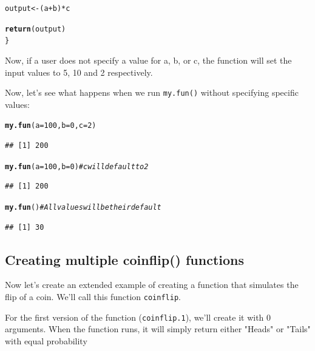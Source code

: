 \documentclass{tufte-book}\usepackage[]{graphicx}\usepackage[]{color}
\makeatletter
\newcommand{\hlnum}[1]{\textcolor[rgb]{0.686,0.059,0.569}{#1}}%
\newcommand{\hlcom}[1]{\textcolor[rgb]{0.678,0.584,0.686}{\textit{#1}}}%
\newcommand{\hlopt}[1]{\textcolor[rgb]{0,0,0}{#1}}%
\newcommand{\hlstd}[1]{\textcolor[rgb]{0.345,0.345,0.345}{#1}}%
\newcommand{\hlkwb}[1]{\textcolor[rgb]{0.69,0.353,0.396}{#1}}%
\newcommand{\hlkwc}[1]{\textcolor[rgb]{0.333,0.667,0.333}{#1}}%
\newcommand{\hlkwd}[1]{\textcolor[rgb]{0.737,0.353,0.396}{\textbf{#1}}}%
\newenvironment{kframe}{%
 \def\at@end@of@kframe{}%
 \ifinner\ifhmode%
  \def\at@end@of@kframe{\end{minipage}}%
  \begin{minipage}{\columnwidth}%
 \fi\fi%
 \def\FrameCommand##1{\hskip\@totalleftmargin \hskip-\fboxsep
 \colorbox{shadecolor}{##1}\hskip-\fboxsep
     \hskip-\linewidth \hskip-\@totalleftmargin \hskip\columnwidth}%
 \MakeFramed {\advance\hsize-\width
   \@totalleftmargin\z@ \linewidth\hsize
   \@setminipage}}%
 {\par\unskip\endMakeFramed%
 \at@end@of@kframe}
\newenvironment{knitrout}{}{} %
\makeatother
\begin{document}
\begin{footnotesize}
\begin{knitrout}
\begin{kframe}
\begin{alltt}
  \hlstd{output} \hlkwb{<-} \hlstd{(a} \hlopt{+} \hlstd{b)} \hlopt{*} \hlstd{c}

  \hlkwd{return}\hlstd{(output)}
\hlstd{\}}
\end{alltt}
\end{kframe}
\end{knitrout}

Now, if a user does not specify a value for a, b, or c, the function will set the input values to 5, 10 and 2 respectively.

Now, let's see what happens when we run \texttt{my.fun()} without specifying specific values:

\begin{knitrout}
\color{fgcolor}\begin{kframe}
\begin{alltt}
\hlkwd{my.fun}\hlstd{(}\hlkwc{a} \hlstd{=} \hlnum{100}\hlstd{,} \hlkwc{b} \hlstd{=} \hlnum{0}\hlstd{,} \hlkwc{c} \hlstd{=} \hlnum{2}\hlstd{)}
\end{alltt}
\begin{verbatim}
## [1] 200
\end{verbatim}
\begin{alltt}
\hlkwd{my.fun}\hlstd{(}\hlkwc{a} \hlstd{=} \hlnum{100}\hlstd{,} \hlkwc{b} \hlstd{=} \hlnum{0}\hlstd{)}  \hlcom{# c will default to 2}
\end{alltt}
\begin{verbatim}
## [1] 200
\end{verbatim}
\begin{alltt}
\hlkwd{my.fun}\hlstd{()}  \hlcom{# All values will be their default}
\end{alltt}
\begin{verbatim}
## [1] 30
\end{verbatim}
\end{kframe}
\end{knitrout}


\subsection{Creating multiple coinflip() functions}

Now let's create an extended example of creating a function that simulates the flip of a coin. We'll call this function \texttt{coinflip}.

For the first version of the function (\texttt{coinflip.1}), we'll create it with 0 arguments. When the function runs, it will simply return either "Heads" or "Tails" with equal probability


\end{footnotesize}
\end{document}
